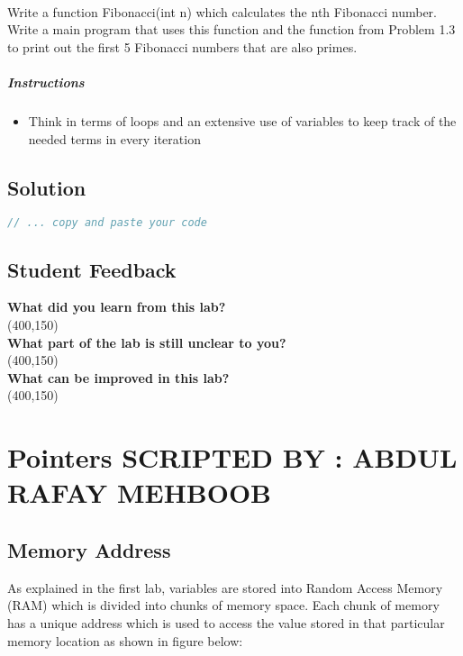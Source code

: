 \documentclass[11pt,fleqn]{book} %
\begin{document}
~\\
\begin{problem}
  Write a function Fibonacci(int n) which calculates the nth Fibonacci number. Write a main program that uses this function and the function from Problem 1.3 to print out the first 5 Fibonacci numbers that are also primes.
  \paragraph{Instructions}
  \begin{itemize}
  \item Think in terms of loops and an extensive use of variables to keep track of the needed terms in every iteration
  \end{itemize}
\end{problem}

\newpage
\section{Solution}
\begin{lstlisting}[language=C++]
  // ... copy and paste your code
\end{lstlisting}

\newpage
\section{Student Feedback}
\textbf{What did you learn from this lab?}\\ 
\framebox(400,150){}\\
\textbf{What part of the lab is still unclear to you?}\\
\framebox(400,150){}\\
\textbf{What can be improved in this lab?}\\ 
\framebox(400,150){}
\newpage
\chapter{Pointers \hspace{60mm} {\textsc{\small SCRIPTED BY : ABDUL RAFAY MEHBOOB}}}
\section{Memory Address}

As explained in the first lab, variables are stored into Random Access Memory (RAM) which is divided into chunks of memory space. Each chunk of memory has a unique address which is used to access the value stored in that particular memory location as shown in figure below:
\end{document}
